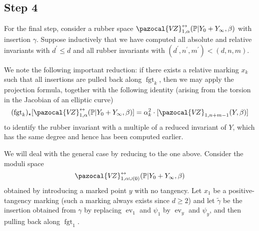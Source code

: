 \documentclass[11pt]{amsart}
\newcommand{\VZ}{\pazocal{V\!Z}}
\newcommand{\st}{\star}
\newcommand{\ev}{\operatorname{ev}}
\newcommand{\fgt}{\operatorname{fgt}}
\theoremstyle{definition}
\theoremstyle{definition}
\begin{document}
\subsection*{Step 4} For the final step, consider a rubber space $\VZ^{\leftrightarrow}_{1,\alpha}(\mathbb P|Y_0+Y_\infty,\beta)$ with insertion $\gamma$. Suppose inductively that we have computed all absolute and relative invariants with $d^\prime \leq d$ and all rubber invariants with $(d^\prime,n^\prime,m^\prime) < (d,n,m)$.

We note the following important reduction: if there exists a relative marking $x_k$ such that all insertions are pulled back along $\fgt_{k}$, then we may apply the projection formula, together with the following identity (arising from the torsion in the Jacobian of an elliptic curve)
\begin{equation*} (\fgt_{k})_\st [\VZ^{\leftrightarrow}_{1,\alpha}(\mathbb P|Y_0+Y_\infty,\beta)] = \alpha_k^2 \cdot [\VZ_{1,n+m-1}(Y,\beta)] \end{equation*}
to identify the rubber invariant with a multiple of a reduced invariant of $Y$, which has the same degree and hence has been computed earlier.

We will deal with the general case by reducing to the one above. Consider the moduli space
\begin{equation*}\label{step 4 recursion space} \VZ^{\leftrightarrow}_{1,\alpha\cup (0)}(\mathbb P|Y_0+Y_\infty,\beta)\end{equation*}
obtained by introducing a marked point $y$ with no tangency. Let $x_1$ be a positive-tangency marking (such a marking always exists since $d \geq 2$) and let $\tilde\gamma$ be the insertion obtained from $\gamma$ by replacing $\ev_1$ and $\psi_1$ by $\ev_y$ and $\psi_y$, and then pulling back along $\fgt_1$.
\end{document}
